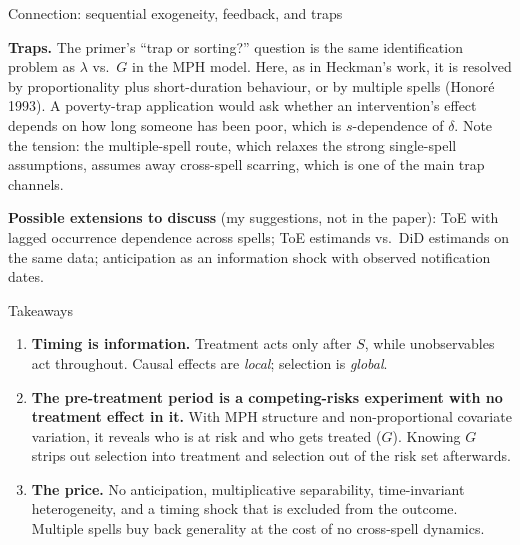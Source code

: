 \documentclass[aspectratio=169,10pt]{beamer}
\newcommand{\1}{\mathbf{1}}
\begin{document}
\begin{frame}{Connection: sequential exogeneity, feedback, and traps}
{\textbf{Traps.} The primer's ``trap or sorting?'' question is the same identification problem as $\lambda$ vs.\ $G$ in the MPH model. Here, as in Heckman's work, it is resolved by proportionality plus short-duration behaviour, or by multiple spells (Honoré 1993). A poverty-trap application would ask whether an intervention's effect depends on how long someone has been poor, which is $s$-dependence of $\delta$. Note the tension: the multiple-spell route, which relaxes the strong single-spell assumptions, assumes away cross-spell scarring, which is one of the main trap channels.

\textbf{Possible extensions to discuss} (my suggestions, not in the paper): ToE with lagged occurrence dependence across spells; ToE estimands vs.\ DiD estimands on the same data; anticipation as an information shock with observed notification dates.
}
\end{frame}

\begin{frame}{Takeaways}
  \begin{enumerate}
    \item \textbf{Timing is information.} Treatment acts only after $S$, while unobservables act throughout. Causal effects are \emph{local}; selection is \emph{global}.
    \item \textbf{The pre-treatment period is a competing-risks experiment with no treatment effect in it.} With MPH structure and non-proportional covariate variation, it reveals who is at risk and who gets treated ($G$). Knowing $G$ strips out selection into treatment and selection out of the risk set afterwards.
    \item \textbf{The price.} No anticipation, multiplicative separability, time-invariant heterogeneity, and a timing shock that is excluded from the outcome. Multiple spells buy back generality at the cost of no cross-spell dynamics.
  \end{enumerate}
\end{frame}
\end{document}
